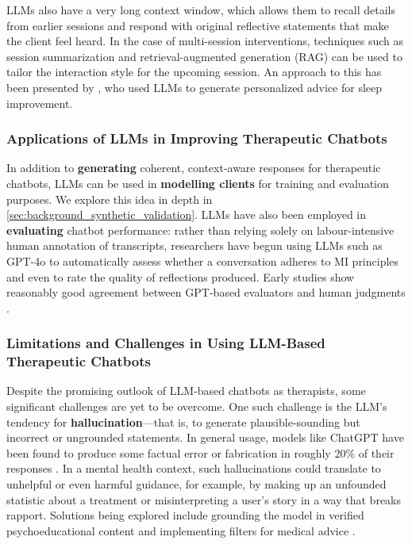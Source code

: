 LLMs also have a very long context window, which allows them to recall details from earlier sessions and respond with original reflective statements that make the client feel heard. In the case of multi-session interventions, techniques such as session summarization and retrieval-augmented generation (RAG) can be used to tailor the interaction style for the upcoming session. An approach to this has been presented by \citet{corda2024context}, who used LLMs to generate personalized advice for sleep improvement.


\subsubsection{Applications of LLMs in Improving Therapeutic Chatbots}
In addition to \textbf{generating} coherent, context-aware responses for therapeutic chatbots, LLMs can be used in \textbf{modelling clients} for training and evaluation purposes. We explore this idea in depth in \cref{sec:background_synthetic_validation}. LLMs have also been employed in \textbf{evaluating} chatbot performance: rather than relying solely on labour-intensive human annotation of transcripts, researchers have begun using LLMs such as GPT-4o to automatically assess whether a conversation adheres to MI principles and even to rate the quality of reflections produced. Early studies show reasonably good agreement between GPT-based evaluators and human judgments \cite{Scholich2025}.


\subsubsection{Limitations and Challenges in Using LLM-Based Therapeutic Chatbots}
Despite the promising outlook of LLM-based chatbots as therapists, some significant challenges are yet to be overcome. One such challenge is the LLM's tendency for \textbf{hallucination}—that is, to generate plausible-sounding but incorrect or ungrounded statements. In general usage, models like ChatGPT have been found to produce some factual error or fabrication in roughly 20\% of their responses \cite{Li2023}. In a mental health context, such hallucinations could translate to unhelpful or even harmful guidance, for example, by making up an unfounded statistic about a treatment or misinterpreting a user's story in a way that breaks rapport. Solutions being explored include grounding the model in verified psychoeducational content and implementing filters for medical advice \cite{Amugongo2025RAG}.


